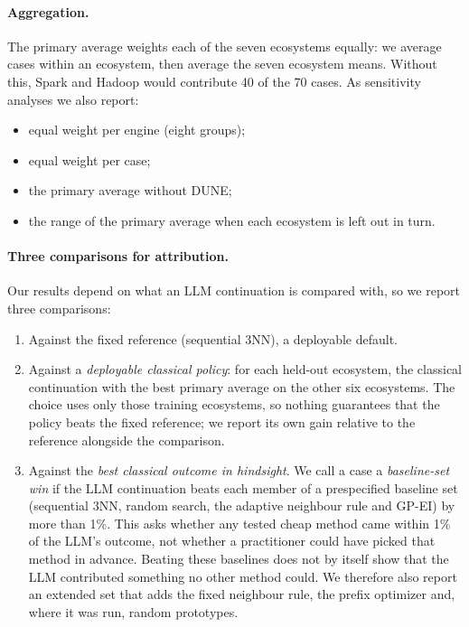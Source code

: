 \paragraph{Aggregation.} The primary average weights each of the seven ecosystems equally: we average cases within an ecosystem, then average the seven ecosystem means. Without this, Spark and Hadoop would contribute 40 of the 70 cases. As sensitivity analyses we also report:
\begin{itemize}
  \item equal weight per engine (eight groups);
  \item equal weight per case;
  \item the primary average without DUNE;
  \item the range of the primary average when each ecosystem is left out in turn.
\end{itemize}

\paragraph{Three comparisons for attribution.} Our results depend on what an LLM continuation is compared with, so we report three comparisons:
\begin{enumerate}
  \item Against the fixed reference (sequential 3NN), a deployable default.
  \item Against a \emph{deployable classical policy}: for each held-out ecosystem, the classical continuation with the best primary average on the other six ecosystems. The choice uses only those training ecosystems, so nothing guarantees that the policy beats the fixed reference; we report its own gain relative to the reference alongside the comparison.
  \item Against the \emph{best classical outcome in hindsight}. We call a case a \emph{baseline-set win} if the LLM continuation beats each member of a prespecified baseline set (sequential 3NN, random search, the adaptive neighbour rule and GP-EI) by more than 1\%. This asks whether any tested cheap method came within 1\% of the LLM's outcome, not whether a practitioner could have picked that method in advance. Beating these baselines does not by itself show that the LLM contributed something no other method could. We therefore also report an extended set that adds the fixed neighbour rule, the prefix optimizer and, where it was run, random prototypes.
\end{enumerate}

